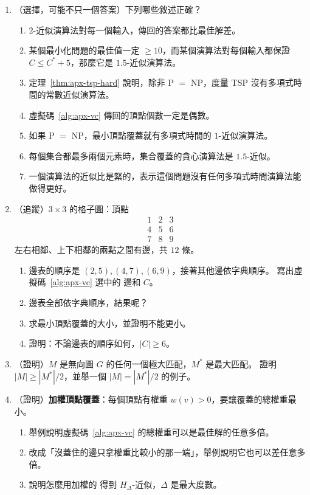 \begin{enumerate}
\item \label{q:apx-mc}（選擇，可能不只一個答案）下列哪些敘述正確？
\begin{enumerate}
\item $2$-近似演算法對每一個輸入，傳回的答案都比最佳解差。
\item 某個最小化問題的最佳值一定 $\ge 10$，而某個演算法對每個輸入都保證 $C \le C^* + 5$，那麼它是
$1.5$-近似演算法。
\item 定理~\ref{thm:apx-tsp-hard} 說明，除非 P $=$ NP，度量 TSP 沒有多項式時間的常數近似演算法。
\item 虛擬碼~\ref{alg:apx-vc} 傳回的頂點個數一定是偶數。
\item 如果 P $=$ NP，最小頂點覆蓋就有多項式時間的 $1$-近似演算法。
\item 每個集合都最多兩個元素時，集合覆蓋的貪心演算法是 $1.5$-近似。
\item 一個演算法的近似比是緊的，表示這個問題沒有任何多項式時間演算法能做得更好。
\end{enumerate}

\item \label{q:apx-vc-trace}（追蹤）$3 \times 3$ 的格子圖：頂點
\[
\begin{matrix} 1 & 2 & 3 \\ 4 & 5 & 6 \\ 7 & 8 & 9 \end{matrix}
\]
左右相鄰、上下相鄰的兩點之間有邊，共 $12$ 條。
\begin{enumerate}
\item 邊表的順序是 $(2,5), (4,7), (6,9)$，接著其他邊依字典順序。 寫出虛擬碼~\ref{alg:apx-vc} 選中的
邊和 $C$。
\item 邊表全部依字典順序，結果呢？
\item 求最小頂點覆蓋的大小，並證明不能更小。
\item 證明：不論邊表的順序如何，$|C| \ge 6$。
\end{enumerate}

\item \label{q:apx-matching}（證明）$M$ 是無向圖 $G$ 的任何一個極大匹配，$M^*$ 是最大匹配。 證明
$|M| \ge |M^*| / 2$，並舉一個 $|M| = |M^*|/2$ 的例子。

\item \label{q:apx-wvc}（證明）\textbf{加權頂點覆蓋}：每個頂點有權重 $w(v) > 0$，要讓覆蓋的總權重最小。
\begin{enumerate}
\item 舉例說明虛擬碼~\ref{alg:apx-vc} 的總權重可以是最佳解的任意多倍。
\item 改成「沒蓋住的邊只拿權重比較小的那一端」，舉例說明它也可以差任意多倍。
\item 說明怎麼用加權的  得到 $H_\Delta$-近似，$\Delta$ 是最大度數。
\end{enumerate}


\end{enumerate}

